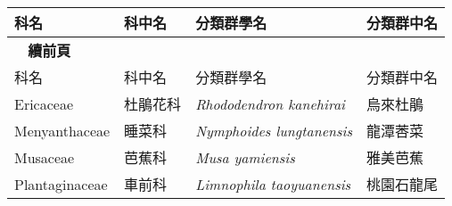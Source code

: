     \begin{longtable}{p{3cm}p{2cm}p{5cm}p{3cm}}
    \toprule
      科名 & 科中名 & 分類群學名 & 分類群中名  \\
    \midrule 
    \endfirsthead
    
    {{\bfseries \tablename\ \thetable{} 續前頁 }} \\
    科名 & 科中名 & 分類群學名 & 分類群中名  \\
    \midrule
    \endhead
            Ericaceae & 杜鵑花科 & \textit{Rhododendron kanehirai}  & 烏來杜鵑\\
    Menyanthaceae & 睡菜科 & \textit{Nymphoides lungtanensis}  & 龍潭莕菜\\
    Musaceae & 芭蕉科 & \textit{Musa yamiensis}  & 雅美芭蕉\\
    Plantaginaceae & 車前科 & \textit{Limnophila taoyuanensis}  & 桃園石龍尾\\
    \bottomrule
    \end{longtable}
